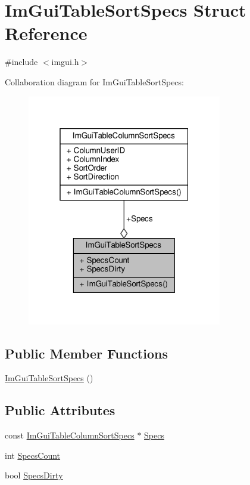 \hypertarget{structImGuiTableSortSpecs}{}\section{Im\+Gui\+Table\+Sort\+Specs Struct Reference}
\label{structImGuiTableSortSpecs}


{\ttfamily \#include $<$imgui.\+h$>$}



Collaboration diagram for Im\+Gui\+Table\+Sort\+Specs\+:
\nopagebreak
\begin{figure}[H]
\begin{center}
\leavevmode
\includegraphics[width=241pt]{structImGuiTableSortSpecs__coll__graph}
\end{center}
\end{figure}
\subsection*{Public Member Functions}
\begin{DoxyCompactItemize}
\item 
\hyperlink{structImGuiTableSortSpecs_a656480bca4b2c19d3502e4fc6ce28c65}{Im\+Gui\+Table\+Sort\+Specs} ()
\end{DoxyCompactItemize}
\subsection*{Public Attributes}
\begin{DoxyCompactItemize}
\item 
const \hyperlink{structImGuiTableColumnSortSpecs}{Im\+Gui\+Table\+Column\+Sort\+Specs} $\ast$ \hyperlink{structImGuiTableSortSpecs_ac4699dc1e604ad5be5d8d62f70776847}{Specs}
\item 
int \hyperlink{structImGuiTableSortSpecs_a479ec858bd7f252a91675487f4e7c202}{Specs\+Count}
\item 
bool \hyperlink{structImGuiTableSortSpecs_a9ecfbcaee92c37003bbb723777358ca3}{Specs\+Dirty}
\end{DoxyCompactItemize}


